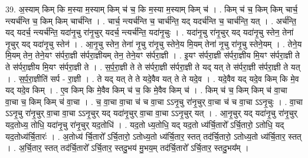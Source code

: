 \documentclass[17pt]{extarticle}
\begin{document}
39. अ॒स्याम् किम् कि म॒स्या म॒स्याम् किम् च॑ च॒ कि म॒स्या म॒स्याम् किम् च॑ । . किम् च॑ च॒ किम् किम् चार्च॒ न्त्यर्च॑न्ति च॒ किम् किम् चार्च॑न्ति । . चार्च॒ न्त्यर्च॑न्ति च॒ चार्च॑न्ति॒ यद् यदर्च॑न्ति च॒ चार्च॑न्ति॒ यत् । . अर्च॑न्ति॒ यद् यदर्च॒ न्त्यर्च॑न्ति॒ यदा॑नृ॒चु रा॑नृ॒चुर् यदर्च॒ न्त्यर्च॑न्ति॒ यदा॑नृ॒चुः । . यदा॑नृ॒चु रा॑नृ॒चुर् यद् यदा॑नृ॒चु स्तेन॒ तेना॑ नृ॒चुर् यद् यदा॑नृ॒चु स्तेन॑ । . आ॒नृ॒चु स्तेन॒ तेना॑ नृ॒चु रा॑नृ॒चु स्तेने॒य मि॒यम् तेना॑ नृ॒चु रा॑नृ॒चु स्तेने॒यम् । . तेने॒य मि॒यम् तेन॒ तेने॒यꣳ स॑र्परा॒ज्ञी स॑र्परा॒ज्ञीयम् तेन॒ तेने॒यꣳ स॑र्परा॒ज्ञी । . इ॒यꣳ स॑र्परा॒ज्ञी स॑र्परा॒ज्ञीय मि॒यꣳ स॑र्परा॒ज्ञी ते ते स॑र्परा॒ज्ञीय मि॒यꣳ स॑र्परा॒ज्ञी ते । . स॒र्प॒रा॒ज्ञी ते ते स॑र्परा॒ज्ञी स॑र्परा॒ज्ञी ते यद् यत् ते स॑र्परा॒ज्ञी स॑र्परा॒ज्ञी ते यत् । . स॒र्प॒रा॒ज्ञीति॑ सर्प - रा॒ज्ञी । . ते यद् यत् ते ते यदे॒वैव यत् ते ते यदे॒व । . यदे॒वैव यद् यदे॒व किम् कि मे॒व यद् यदे॒व किम् । . ए॒व किम् कि मे॒वैव किम् च॑ च॒ कि मे॒वैव किम् च॑ । . किम् च॑ च॒ किम् किम् च॑ वा॒चा वा॒चा च॒ किम् किम् च॑ वा॒चा । . च॒ वा॒चा वा॒चा च॑ च वा॒चा ऽऽनृ॒चु रा॑नृ॒चुर् वा॒चा च॑ च वा॒चा ऽऽनृ॒चुः । . वा॒चा ऽऽनृ॒चु रा॑नृ॒चुर् वा॒चा वा॒चा ऽऽनृ॒चुर् यद् यदा॑नृ॒चुर् वा॒चा वा॒चा ऽऽनृ॒चुर् यत् । . आ॒नृ॒चुर् यद् यदा॑नृ॒चु रा॑नृ॒चुर् यद॒तोध्य॒ तोधि॒ यदा॑नृ॒चु रा॑नृ॒चुर् यद॒तोधि॑ । . यद॒तो ध्य॒तोधि॒ यद् यद॒तो ध्य॑र्चि॒तारो᳚ ऽर्चि॒तारो॒ ऽतोधि॒ यद् यद॒तोध्य॑र्चि॒तारः॑ । . अ॒तोध्य॑ र्चि॒तारो᳚ ऽर्चि॒तारो॒ ऽतोध्य॒तो ध्य॑र्चि॒तार॒ स्तत् तद॑र्चि॒तारो॒ ऽतोध्य॒तो ध्य॑र्चि॒तार॒ स्तत् । . अ॒र्चि॒तार॒ स्तत् तद॑र्चि॒तारो᳚ ऽर्चि॒तार॒ स्तदु॒भय॑ मु॒भय॒म् तद॑र्चि॒तारो᳚ ऽर्चि॒तार॒ स्तदु॒भय᳚म् । \newline
\pagebreak
{}
\end{document}

